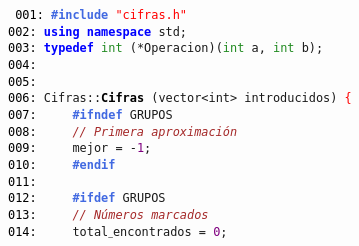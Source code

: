 \documentclass[a4paper,10pt]{scrartcl}
\begin{document}
   \small
   \texttt{%
   \noindent
   \mbox{}\texttt{\textcolor{Black}{001:}} \textbf{\textcolor{RoyalBlue}{\#include}}\ \texttt{\textcolor{Red}{"{}cifras.h"{}}} \\
   \mbox{}\texttt{\textcolor{Black}{002:}} \textbf{\textcolor{Blue}{using}}\ \textbf{\textcolor{Blue}{namespace}}\ std\textcolor{BrickRed}{;} \\
   \mbox{}\texttt{\textcolor{Black}{003:}} \textbf{\textcolor{Blue}{typedef}}\ \textcolor{ForestGreen}{int}\ \textcolor{BrickRed}{(*}Operacion\textcolor{BrickRed}{)(}\textcolor{ForestGreen}{int}\ a\textcolor{BrickRed}{,}\ \textcolor{ForestGreen}{int}\ b\textcolor{BrickRed}{);}\  \\
   \mbox{}\texttt{\textcolor{Black}{004:}}  \\
   \mbox{}\texttt{\textcolor{Black}{005:}}  \\
   \mbox{}\texttt{\textcolor{Black}{006:}} Cifras\textcolor{BrickRed}{::}\textbf{\textcolor{Black}{Cifras}}\ \textcolor{BrickRed}{(}\textcolor{TealBlue}{vector\textless{}int\textgreater{}}\ introducidos\textcolor{BrickRed}{)}\ \textcolor{Red}{\{} \\
   \mbox{}\texttt{\textcolor{Black}{007:}} \textbf{\textcolor{RoyalBlue}{\ \ \ \ \#ifndef}}\ GRUPOS \\
   \mbox{}\texttt{\textcolor{Black}{008:}} \ \ \ \ \textit{\textcolor{Brown}{//\ Primera\ aproximación}} \\
   \mbox{}\texttt{\textcolor{Black}{009:}} \ \ \ \ mejor\ \textcolor{BrickRed}{=}\ \textcolor{BrickRed}{-}\textcolor{Purple}{1}\textcolor{BrickRed}{;} \\
   \mbox{}\texttt{\textcolor{Black}{010:}} \textbf{\textcolor{RoyalBlue}{\ \ \ \ \#endif}} \\
   \mbox{}\texttt{\textcolor{Black}{011:}} \ \  \\
   \mbox{}\texttt{\textcolor{Black}{012:}} \textbf{\textcolor{RoyalBlue}{\ \ \ \ \#ifdef}}\ GRUPOS \\
   \mbox{}\texttt{\textcolor{Black}{013:}} \ \ \ \ \textit{\textcolor{Brown}{//\ Números\ marcados}} \\
   \mbox{}\texttt{\textcolor{Black}{014:}} \ \ \ \ total$\_$encontrados\ \textcolor{BrickRed}{=}\ \textcolor{Purple}{0}\textcolor{BrickRed}{;} \\
}
\end{document}
